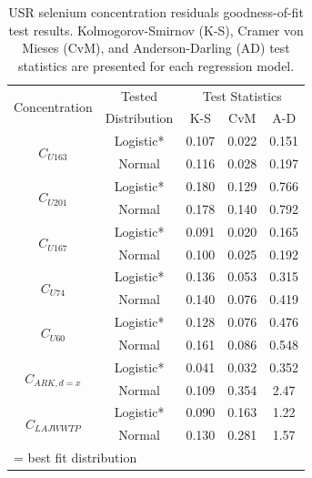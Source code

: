 \begin{linenumbers}
\begin{table}[htbp]
  \centering
  \caption[USR selenium concentration residuals goodness-of-fit test results.]{USR selenium concentration residuals goodness-of-fit test results.  Kolmogorov-Smirnov (K-S), Cramer von Mieses (CvM), and Anderson-Darling (AD) test statistics are presented for each regression model.}
    \begin{tabular}{ccccc}
    \toprule
    \multirow{2}{*}{Concentration}&Tested & \multicolumn{3}{c}{Test Statistics} \\ \cmidrule(r{.5em}l){3-5}
    &Distribution  & K-S   & CvM   & A-D \\
    \toprule
    \multirow{2}{*}{$ C_{U163} $}			&Logistic*	&0.107	&0.022	&0.151 \\
    								&Normal		&0.116	&0.028	&0.197 \\
    \midrule
    \multirow{2}{*}{$ C_{U201} $}			&Logistic*	&0.180	&0.129	&0.766	\\
    								&Normal		&0.178	&0.140	&0.792	\\
    \midrule
    \multirow{2}{*}{$ C_{U167} $}		&Logistic*	&0.091	&0.020	&0.165	\\
    								&Normal		&0.100	&0.025	&0.192	\\
    \midrule
    \multirow{2}{*}{$ C_{U74} $}		&Logistic*	&0.136	&0.053	&0.315	\\
    								&Normal		&0.140	&0.076	&0.419	\\
    \midrule
    \multirow{2}{*}{$ C_{U60} $}		&Logistic*	&0.128	&0.076	&0.476	\\
    								&Normal		&0.161	&0.086	&0.548	\\
    \midrule
    \multirow{2}{*}{$ C_{ARK,d=x} $}		&Logistic*	&0.041	&0.032	&0.352	\\
    								&Normal		&0.109	&0.354	&2.47	\\
    \midrule
    \multirow{2}{*}{$ C_{LAJWWTP} $}	&Logistic*	&0.090	&0.163	&1.22	\\
    								&Normal		&0.130	&0.281	&1.57	\\
    \bottomrule
    \multicolumn{5}{l}{\footnotesize * = best fit distribution}\\
    \end{tabular}%
  \label{tab:USRGoF}%
\end{table}%


\end{linenumbers}
